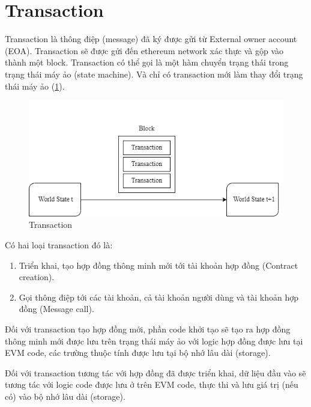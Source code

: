 \documentclass[../main.tex]{subfiles}
\begin{document}
\section{Transaction}
Transaction là thông điệp (message) đã ký được gửi từ External owner account (EOA). Transaction sẽ được gửi đến ethereum network xác thực và gộp vào thành một block. Transaction có thể gọi là một hàm chuyển trạng thái trong trạng thái máy ảo (state machine). Và chỉ có transaction mới làm thay đổi trạng thái máy ảo (\ref{fig:transaction}).
\begin{figure}[h!]
    \centering
    \includegraphics[scale = 0.7]{Figure/transaction.png}
    \caption{Transaction}
    \label{fig:transaction}
\end{figure}
Có hai loại transaction đó là:
\begin{enumerate}
    \item Triển khai, tạo hợp đồng thông minh mới tới tài khoản hợp đồng (Contract creation).
    \item Gọi thông điệp tới các tài khoản, cả tài khoản người dùng và tài khoản hợp đồng (Message call).
\end{enumerate}

Đối với transaction tạo hợp đồng mới, phần code khởi tạo sẽ tạo ra hợp đồng thông minh mới được lưu trên trạng thái máy ảo với logic hợp đồng được lưu tại EVM code, các trường thuộc tính được lưu tại bộ nhớ lâu dài (storage).

Đối với transaction tương tác với hợp đồng đã được triển khai, dữ liệu đầu vào sẽ tương tác với logic code được lưu ở trên EVM code, thực thi và lưu giá trị (nếu có) vào bộ nhớ lâu dài (storage).
\end{document}
